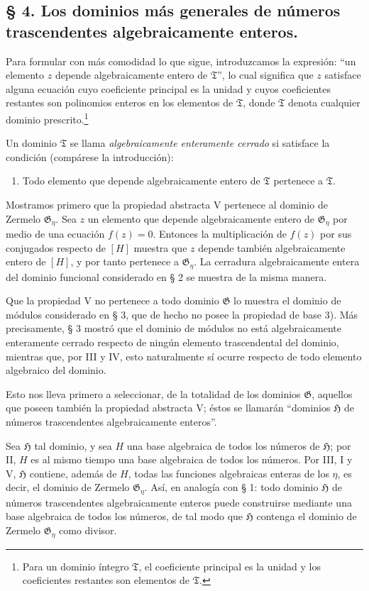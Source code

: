 \subsection*{§ 4. Los dominios más generales de números trascendentes algebraicamente enteros.}

Para formular con más comodidad lo que sigue, introduzcamos la expresión: ``un elemento $z$ depende algebraicamente entero de $\mathfrak T$'', lo cual significa que $z$ satisface alguna ecuación cuyo coeficiente principal es la unidad y cuyos coeficientes restantes son polinomios enteros en los elementos de $\mathfrak T$, donde $\mathfrak T$ denota cualquier dominio prescrito.\footnote{Para un dominio íntegro $\mathfrak T$, el coeficiente principal es la unidad y los coeficientes restantes son elementos de $\mathfrak T$.}

Un dominio $\mathfrak T$ se llama \emph{algebraicamente enteramente cerrado} si satisface la condición (compárese la introducción):
\begin{enumerate}
\item[V.] Todo elemento que depende algebraicamente entero de $\mathfrak T$ pertenece a $\mathfrak T$.
\end{enumerate}

Mostramos primero que la propiedad abstracta V pertenece al dominio de Zermelo $\mathfrak G_\eta$. Sea $z$ un elemento que depende algebraicamente entero de $\mathfrak G_\eta$ por medio de una ecuación $f(z)=0$. Entonces la multiplicación de $f(z)$ por sus conjugados respecto de $[H]$ muestra que $z$ depende también algebraicamente entero de $[H]$, y por tanto pertenece a $\mathfrak G_\eta$. La cerradura algebraicamente entera del dominio funcional considerado en § 2 se muestra de la misma manera.

Que la propiedad V no pertenece a todo dominio $\mathfrak G$ lo muestra el dominio de módulos considerado en § 3, que de hecho no posee la propiedad de base 3). Más precisamente, § 3 mostró que el dominio de módulos no está algebraicamente enteramente cerrado respecto de ningún elemento trascendental del dominio, mientras que, por III y IV, esto naturalmente sí ocurre respecto de todo elemento algebraico del dominio.

Esto nos lleva primero a seleccionar, de la totalidad de los dominios $\mathfrak G$, aquellos que poseen también la propiedad abstracta V; éstos se llamarán ``dominios $\mathfrak H$ de números trascendentes algebraicamente enteros''.

Sea $\mathfrak H$ tal dominio, y sea $H$ una base algebraica de todos los números de $\mathfrak H$; por II, $H$ es al mismo tiempo una base algebraica de todos los números. Por III, I y V, $\mathfrak H$ contiene, además de $H$, todas las funciones algebraicas enteras de los $\eta$, es decir, el dominio de Zermelo $\mathfrak G_\eta$. Así, en analogía con § 1: todo dominio $\mathfrak H$ de números trascendentes algebraicamente enteros puede construirse mediante una base algebraica de todos los números, de tal modo que $\mathfrak H$ contenga el dominio de Zermelo $\mathfrak G_\eta$ como divisor.

